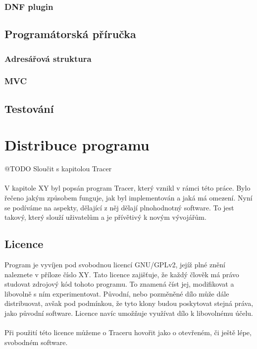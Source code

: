 \documentclass[10pt,a4paper]{article}
\begin{document}
		\subsubsection{DNF plugin}

		\subsection{Programátorská příručka}
			\subsubsection{Adresářová struktura}
			\subsubsection{MVC}
			\subsection{Testování}

	\section{Distribuce programu}
		@TODO Sloučit s kapitolou Tracer\\\\
		V kapitole XY byl popsán program Tracer, který vznikl v rámci této práce. Bylo řečeno jakým způsobem funguje, jak byl implementován a jaká má omezení. Nyní se podíváme na aspekty, dělající z něj dělají plnohodnotný software. To jest takový, který slouží uživatelům a je přívětivý k novým vývojářům.

		\subsection{Licence}
		Program je vyvíjen pod svobodnou licencí GNU/GPLv2, jejíž plné znění naleznete v příloze číslo XY\@. Tato licence zajišťuje, že každý člověk má právo studovat zdrojový kód tohoto programu. To znamená číst jej, modifikovat a libovolně s ním experimentovat. Původní, nebo pozměněné dílo může dále distribuovat, avšak pod podmínkou, že tyto klony budou poskytovat stejná práva, jako původní software. Licence navíc umožňuje využívat dílo k libovolnému účelu.
		\\
		\\
		Při použití této licence můžeme o Traceru hovořit jako o otevřeném, či ještě lépe, svobodném software.
\end{document}
